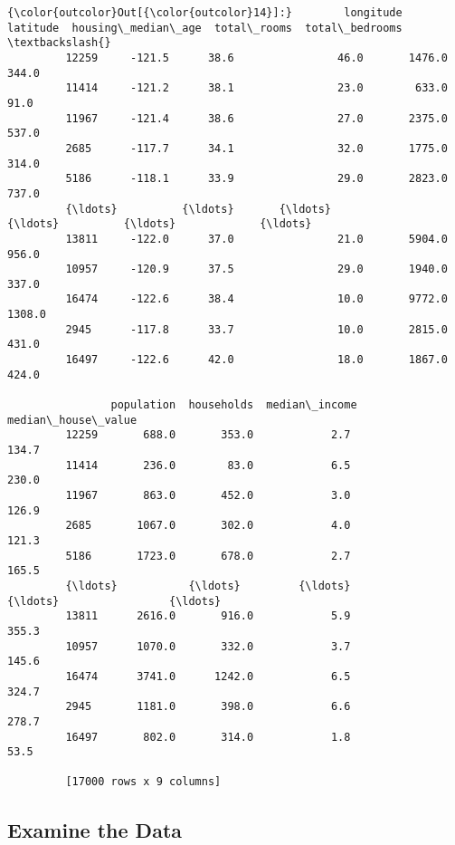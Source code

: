\documentclass[11pt]{article}
\begin{document}
\begin{Verbatim}[commandchars=\\\{\}]
{\color{outcolor}Out[{\color{outcolor}14}]:}        longitude  latitude  housing\_median\_age  total\_rooms  total\_bedrooms  \textbackslash{}
         12259     -121.5      38.6                46.0       1476.0           344.0   
         11414     -121.2      38.1                23.0        633.0            91.0   
         11967     -121.4      38.6                27.0       2375.0           537.0   
         2685      -117.7      34.1                32.0       1775.0           314.0   
         5186      -118.1      33.9                29.0       2823.0           737.0   
         {\ldots}          {\ldots}       {\ldots}                 {\ldots}          {\ldots}             {\ldots}   
         13811     -122.0      37.0                21.0       5904.0           956.0   
         10957     -120.9      37.5                29.0       1940.0           337.0   
         16474     -122.6      38.4                10.0       9772.0          1308.0   
         2945      -117.8      33.7                10.0       2815.0           431.0   
         16497     -122.6      42.0                18.0       1867.0           424.0   
         
                population  households  median\_income  median\_house\_value  
         12259       688.0       353.0            2.7               134.7  
         11414       236.0        83.0            6.5               230.0  
         11967       863.0       452.0            3.0               126.9  
         2685       1067.0       302.0            4.0               121.3  
         5186       1723.0       678.0            2.7               165.5  
         {\ldots}           {\ldots}         {\ldots}            {\ldots}                 {\ldots}  
         13811      2616.0       916.0            5.9               355.3  
         10957      1070.0       332.0            3.7               145.6  
         16474      3741.0      1242.0            6.5               324.7  
         2945       1181.0       398.0            6.6               278.7  
         16497       802.0       314.0            1.8                53.5  
         
         [17000 rows x 9 columns]
\end{Verbatim}
            
    \hypertarget{examine-the-data}{%
\subsection{Examine the Data}\label{examine-the-data}}
\end{document}
